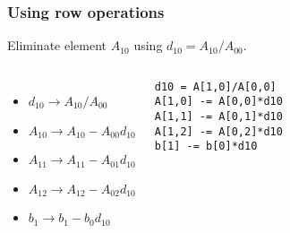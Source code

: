 \begin{frame}[fragile]
  \frametitle{Using row operations}
  Eliminate element $A_{10}$ using $d_{10}=A_{10}/A_{00}$.
  \vfill
  \vfill\pause
  \begin{columns}
  \begin{itemize}
    \item $d_{10}\rightarrow A_{10}/A_{00}$
    \item $A_{10}\rightarrow A_{10}-A_{00}d_{10}$
    \item $A_{11}\rightarrow A_{11}-A_{01}d_{10}$
    \item $A_{12}\rightarrow A_{12}-A_{02}d_{10}$
    \item $b_1   \rightarrow b_1   -b_0   d_{10}$
  \end{itemize}
  \pause
   \begin{lstlisting}
d10 = A[1,0]/A[0,0]
A[1,0] -= A[0,0]*d10
A[1,1] -= A[0,1]*d10
A[1,2] -= A[0,2]*d10
b[1] -= b[0]*d10
   \end{lstlisting}
  \end{columns}
\end{frame}

